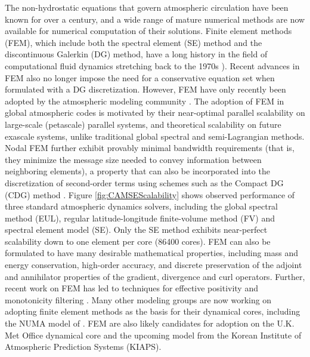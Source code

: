 \documentclass[11pt]{article}
\begin{document}
The non-hydrostatic equations that govern atmospheric circulation have been known for over a century, and a wide range of mature numerical methods are now available for numerical computation of their solutions.  Finite element methods (FEM), which include both the spectral element (SE) method and the discontinuous Galerkin (DG) method, have a long history in the field of computational fluid dynamics stretching back to the 1970s \cite{patera:84,maday1989spectral,FBSR1997JCP,BCCWS1998JCP,peraire11dg,wang_et_al13cfd}).  Recent advances in FEM \cite{huynh2007flux, ullrich2014global} also no longer impose the need for a conservative equation set when formulated with a DG discretization.  However, FEM have only recently been adopted by the atmospheric modeling community \cite{taylor:97,FXGJSHTW2002JCP,FXGTER2004MWR,AFMTJT2004MWR,NTL2005MWR,FXGMR2008JCP,JFKFXG2012JCP}.  The adoption of FEM in global atmospheric codes is motivated by their near-optimal parallel scalability on large-scale (petascale) parallel systems, and theoretical scalability on future exascale systems, unlike traditional global spectral and semi-Lagrangian methods.   Nodal FEM \cite{hesthaven2007nodal} further exhibit provably minimal bandwidth requirements (that is, they minimize the message size needed to convey information between neighboring elements), a property that can also be incorporated into the discretization of second-order terms using schemes such as the Compact DG (CDG) method \cite{peraire08cdg}.  Figure \ref{fig:CAMSEScalability} shows observed performance of three standard atmospheric dynamics solvers, including the global spectral method (EUL), regular latitude-longitude finite-volume method (FV) and spectral element model (SE).  Only the SE method exhibits near-perfect scalability down to one element per core (86400 cores).  FEM can also be formulated to have many desirable mathematical properties, including mass and energy conservation, high-order accuracy, and discrete preservation of the adjoint and annihilator properties of the gradient, divergence and curl operators.  Further, recent work on FEM has led to techniques for effective positivity and monotonicity filtering \cite{OGMATASC2013}.  Many other modeling groups are now working on adopting finite element methods as the basis for their dynamical cores, including the NUMA model of \cite{JFKFXG2012JCP}.  FEM are also likely candidates for adoption on the U.K. Met Office dynamical core and the upcoming model from the Korean Institute of Atmospheric Prediction Systems (KIAPS).
\end{document}
